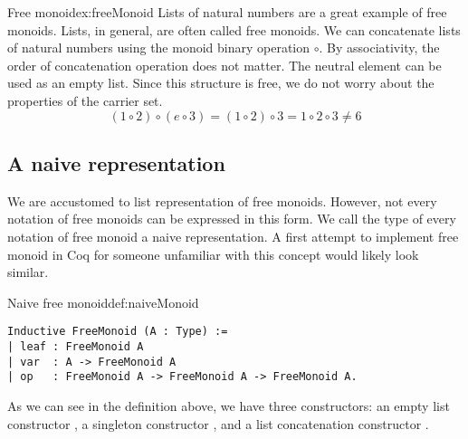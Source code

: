 \begin{example}{Free monoid}{ex:freeMonoid}
Lists of natural numbers are a great example of free monoids. Lists, in general, are often called free monoids. We can concatenate lists of natural numbers using the monoid binary operation $\circ$. By associativity, the order of concatenation operation does not matter. The neutral element can be used as an empty list. Since this structure is free, we do not worry about the properties of the carrier set.
$$(1 \circ 2) \circ (e \circ 3) = (1 \circ 2) \circ 3 =  1 \circ 2 \circ 3 \neq 6$$
\end{example}
\subsection{A naive representation}
We are accustomed to list representation of free monoids. However, not every notation of free monoids can be expressed in this form. We call the type of every notation of free monoid a naive representation. A first attempt to implement free monoid in Coq for someone unfamiliar with this concept would likely look similar. 
\begin{defi}{Naive free monoid}{def:naiveMonoid}
\begin{verbatim}
Inductive FreeMonoid (A : Type) :=
| leaf : FreeMonoid A
| var  : A -> FreeMonoid A
| op   : FreeMonoid A -> FreeMonoid A -> FreeMonoid A.
\end{verbatim}
\end{defi}
As we can see in the definition above, we have three constructors: an empty list constructor , a singleton constructor , and a list concatenation constructor . 
